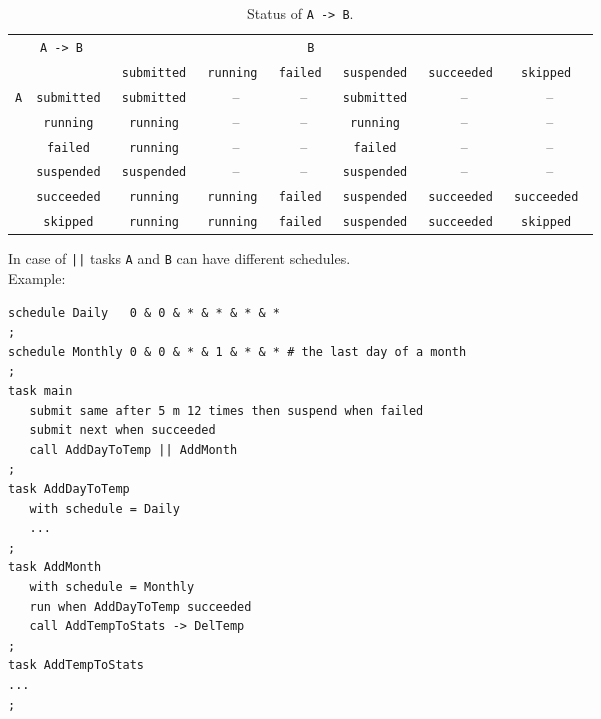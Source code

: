 \documentclass[a4paper,12pt,english,oneside]{book}
\begin{document}
\begin{landscape}
\begin{table}
\begin{tabular}{c|c|cccccc}
		\toprule
		\multicolumn{2}{c|}{\multirow{2}{*}{\tt A -> B}} & \multicolumn{5}{c}{\tt B} \\
		\cmidrule(rl){3-8}
		\multicolumn{2}{c|}{} & \tt submitted & \tt running & \tt failed   & \tt suspended & \tt succeeded  & \tt skipped \\
		\midrule
		\multirow{6}{*}{\tt A}
		& \tt submitted & \tt submitted & \rm --      & \rm --       & \tt submitted & \rm --        & \rm --        \\
		& \tt running   & \tt running   & \rm --      & \rm --       & \tt running   & \rm --        & \rm --        \\
		& \tt failed    & \tt running   & \rm --      & \rm --       & \tt failed    & \rm --        & \rm --        \\
		& \tt suspended & \tt suspended & \rm --      & \rm --       & \tt suspended & \rm --        & \rm --        \\
		& \tt succeeded & \tt running   & \tt running & \tt failed   & \tt suspended & \tt succeeded & \tt succeeded \\
		& \tt skipped   & \tt running   & \tt running & \tt failed   & \tt suspended & \tt succeeded & \tt skipped   \\
		\bottomrule
	\end{tabular}
	\caption{Status of \texttt{A -> B}.}
\end{table}
\end{landscape}

In case of \texttt{||} tasks \verb|A| and \verb|B| can have different schedules.\\
Example:\\
%
\begin{verbatim}
schedule Daily   0 & 0 & * & * & * & *
;
schedule Monthly 0 & 0 & * & 1 & * & * # the last day of a month
;
task main
   submit same after 5 m 12 times then suspend when failed
   submit next when succeeded
   call AddDayToTemp || AddMonth
;
task AddDayToTemp
   with schedule = Daily
   ...
;
task AddMonth
   with schedule = Monthly
   run when AddDayToTemp succeeded
   call AddTempToStats -> DelTemp
;
task AddTempToStats
...
;
\end{verbatim}
\end{document}
